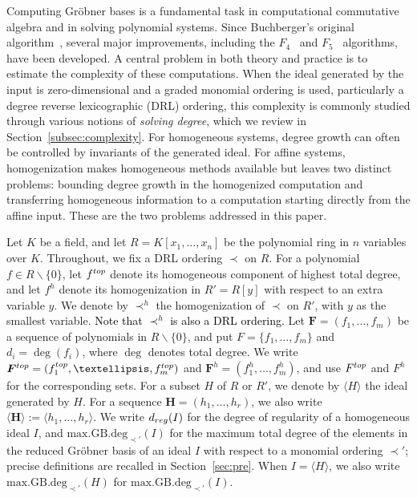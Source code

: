 \documentclass{article}
\theoremstyle{definition}
\theoremstyle{plain}
\theoremstyle{plain}
\theoremstyle{plain}
\theoremstyle{plain}
\numberwithin{equation}{subsection}
\begin{document}
Computing Gr\"obner bases is a fundamental task in computational commutative algebra and in solving polynomial systems.
Since Buchberger's original algorithm~\cite{Buchberger}, several major improvements, including the $F_4$~\cite{F4} and $F_5$~\cite{F5} algorithms, have been developed.
A central problem in both theory and practice is to estimate the complexity of these computations.
When the ideal generated by the input is zero-dimensional and a graded monomial ordering is used, particularly a degree reverse lexicographic (DRL) ordering, this complexity is commonly studied through various notions of \emph{solving degree}, which we review in Section~\ref{subsec:complexity}.
For homogeneous systems, degree growth can often be controlled by invariants of the generated ideal.
For affine systems, homogenization makes homogeneous methods available but leaves two distinct problems:
bounding degree growth in the homogenized computation and transferring homogeneous information to a computation starting directly from the affine input.
These are the two problems addressed in this paper.

Let $K$ be a field, and let $R=K[x_1,\ldots,x_n]$ be the polynomial ring in $n$ variables over $K$.
Throughout, we fix a DRL ordering $\prec$ on $R$.
For a polynomial $f\in R\smallsetminus \{0\}$, let $f^{\rm top}$ denote its homogeneous component of highest total degree, and let $f^h$ denote its homogenization in $R'=R[y]$ with respect to an extra variable $y$.
We denote by $\prec^h$ the homogenization of $\prec$ on $R'$, with $y$ as the smallest variable.
\textcolor{black}{Note that $\prec^h$ is also a DRL ordering.}
Let $\bm F=(f_1,\ldots,f_m)$ be a sequence of polynomials in $R\smallsetminus \{ 0 \}$, and put $F=\{f_1,\ldots,f_m\}$ and $d_i=\deg(f_i)$, where $\deg$ denotes total degree.
We write $\bm F^{\rm top}=(f_1^{\rm top},\ldots,f_m^{\rm top})$ and $\bm F^h=(f_1^h,\ldots,f_m^h)$, and use $F^{\rm top}$ and $F^h$ for the corresponding sets.
For a subset $H$ of $R$ or $R'$, we denote by $\langle H\rangle$ the ideal generated by $H$.
For a sequence $\bm H=(h_1,\ldots,h_r)$, we also write $\langle\bm H\rangle:=\langle h_1,\ldots,h_r\rangle$.
We write $d_{\rm reg}(I)$ for the degree of regularity of a homogeneous ideal $I$, and $\mathrm{max.GB.deg}_{\prec'}(I)$ for the maximum total degree of the elements in the reduced Gr\"obner basis of an ideal $I$ with respect to a monomial ordering $\prec'$; precise definitions are recalled in Section~\ref{sec:pre}.
When $I=\langle H\rangle$, we also write $\mathrm{max.GB.deg}_{\prec'}(H)$ for $\mathrm{max.GB.deg}_{\prec'}(I)$.
\end{document}
